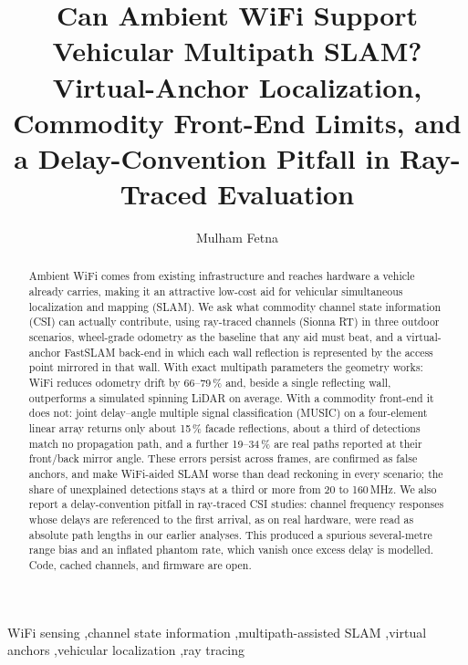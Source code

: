 \documentclass[preprint,12pt]{elsarticle}
\begin{document}
\begin{frontmatter}

\title{Can Ambient WiFi Support Vehicular Multipath SLAM? Virtual-Anchor Localization,
Commodity Front-End Limits, and a Delay-Convention Pitfall in Ray-Traced Evaluation}

\author{Mulham Fetna}

\begin{abstract}
Ambient WiFi comes from existing infrastructure and reaches hardware a vehicle already
carries, making it an attractive low-cost aid for vehicular simultaneous localization and
mapping (SLAM). We ask what commodity channel state information (CSI) can actually contribute,
using ray-traced channels (Sionna RT) in three outdoor scenarios, wheel-grade odometry as the
baseline that any aid must beat, and a virtual-anchor FastSLAM back-end in which each wall
reflection is represented by the access point mirrored in that wall. With exact multipath
parameters the geometry works: WiFi reduces odometry drift by 66--79\,\% and, beside a single
reflecting wall, outperforms a simulated spinning LiDAR on average. With a commodity front-end it does not:
joint delay--angle multiple signal classification (MUSIC) on a four-element linear array returns only about 15\,\% facade
reflections, about a third of detections match no propagation path, and a further 19--34\,\% are
real paths reported at their front/back mirror angle. These errors persist across frames, are
confirmed as false anchors, and make WiFi-aided SLAM worse than dead reckoning in every scenario;
the share of unexplained detections stays at a third or more from 20 to 160\,MHz. We also
report a delay-convention pitfall in ray-traced CSI studies: channel frequency responses whose
delays are referenced to the first arrival, as on real hardware, were read as absolute path
lengths in our earlier analyses. This produced a spurious several-metre range bias and an
inflated phantom rate, which vanish once excess delay is modelled. Code, cached channels, and
firmware are open.
\end{abstract}

\begin{keyword}
WiFi sensing \sep channel state information \sep multipath-assisted SLAM \sep virtual anchors
\sep vehicular localization \sep ray tracing
\end{keyword}

\end{frontmatter}
\end{document}
